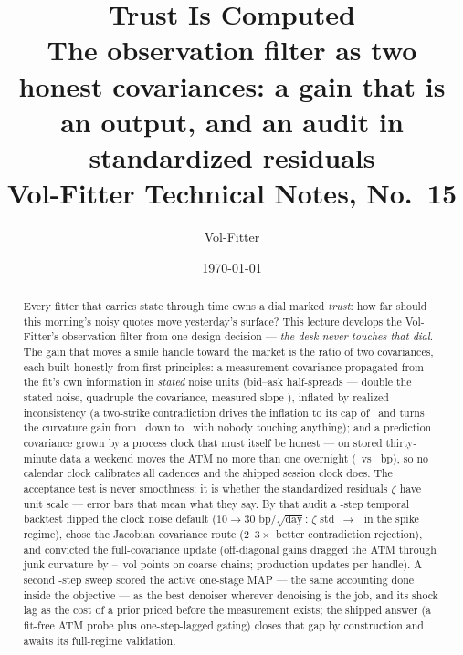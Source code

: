 \documentclass[11pt]{article}
\title{\textbf{Trust Is Computed}\\[2pt]
\large The observation filter as two honest covariances: a gain that is an
output, and an audit in standardized residuals\\[2pt]
\normalsize Vol-Fitter Technical Notes, No.~15}
\author{Vol-Fitter}
\date{\today}
\begin{document}
\maketitle



\begin{abstract}
Every fitter that carries state through time owns a dial marked
\emph{trust}: how far should this morning's noisy quotes move yesterday's
surface?  This lecture develops the Vol-Fitter's observation filter from
one design decision --- \emph{the desk never touches that dial}.  The gain
that moves a smile handle toward the market is the ratio of two
covariances, each built honestly from first principles: a measurement
covariance propagated from the fit's own information in \emph{stated}
noise units (bid--ask half-spreads --- double the stated noise, quadruple
the covariance, measured slope \ktrunitslope), inflated by realized
inconsistency (a two-strike contradiction drives the inflation to its cap
of \ktrcontrarho\ and turns the curvature gain from \ktrcontragainclean\
down to \ktrcontragainkink\ with nobody touching anything); and a
prediction covariance grown by a process clock that must itself be honest
--- on stored thirty-minute data a weekend moves the ATM no more than one
overnight (\ktrmoveweekend\ vs \ktrmoveovernight\ bp), so no calendar
clock calibrates all cadences and the shipped session clock does.  The
acceptance test is never smoothness: it is whether the standardized
residuals $\zeta$ have unit scale --- error bars that mean what they say.
By that audit a \ktrstepstotal-step temporal backtest flipped the clock
noise default ($10\to30$ bp$/\sqrt{\text{day}}$: $\zeta$ std
\ktrzstdspiketen$\,\to\,$\ktrzstdspikethirty\ in the spike regime), chose
the Jacobian covariance route ($2$--$3\times$ better contradiction
rejection), and convicted the full-covariance update (off-diagonal gains
dragged the ATM through junk curvature by
\ktrblowupminpts--\ktrblowupmaxpts\ vol points on coarse chains; production
updates per handle).  A second \ktrstepsvtwo-step sweep scored the active
one-stage MAP --- the same accounting done inside the objective --- as the
best denoiser wherever denoising is the job, and its shock lag as the cost
of a prior priced before the measurement exists; the shipped answer
(a fit-free ATM probe plus one-step-lagged gating) closes that gap by
construction and awaits its full-regime validation.
\end{abstract}
\end{document}
